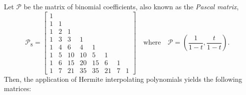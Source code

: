 
\begin{example}
Let $\mathcal{P}$ be the matrix of binomial coefficients, also known as the \textit{Pascal matrix},
\begin{displaymath}
\mathcal{P}_{8}=\left[\begin{matrix}1 &   &   &   &   &   &   &  \\1 & 1 &   &   &   &   &   &  \\1 & 2 & 1 &   &   &   &   &  \\1 & 3 & 3 & 1 &   &   &   &  \\1 & 4 & 6 & 4 & 1 &   &   &  \\1 & 5 & 10 & 10 & 5 & 1 &   &  \\1 & 6 & 15 & 20 & 15 & 6 & 1 &  \\1 & 7 & 21 & 35 & 35 & 21 & 7 & 1\end{matrix}\right]
\quad \text{where} \quad \mathcal{P} = \left(\frac{1}{1-t}, \frac{t}{1-t} \right).
\end{displaymath}
Then, the application of Hermite interpolating polynomials yields the following matrices:
\begin{displaymath}

\end{displaymath}
\end{example}
